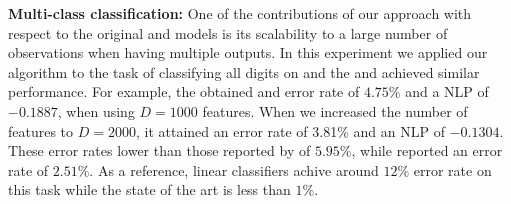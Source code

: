 \textbf{Multi-class classification:} One of the contributions of our approach with respect 
to the original \egp and \ugp models is its scalability to a large number of observations 
when having multiple outputs. In this experiment we applied our algorithm to the task
of classifying all digits on \mnist and 
the \eks and \uks achieved similar performance. For 
example, the \eks obtained and error rate of $ 4.75\%$ and 
a NLP of $-0.1887$, when using $D=1000$ features. When we increased the number 
of features to 	$D=2000$, it attained an error rate of 3.81\% and an NLP of $-0.1304$.
These error rates  lower than those reported by  \citet{gal-et-al-nips-2014} of $5.95\%$, 
while  \citet{dezfouli-bonilla-nips-2015} reported an error 
rate of $2.51\%$. As a reference, linear classifiers achive around $12\%$ error rate on this 
task while the state of the art is less than $1\%$. 

 



 





